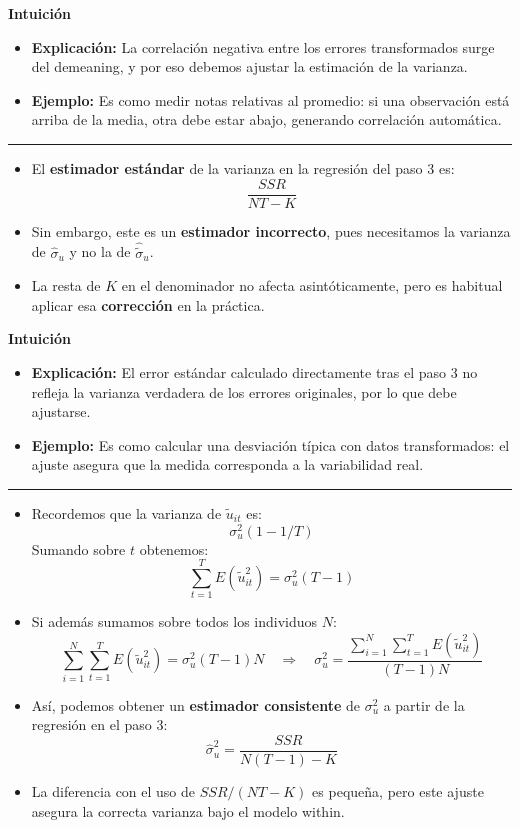 \documentclass[12pt]{article}
\begin{document}
\noindent\textbf{Intuición}
\begin{itemize}
    \item \textbf{Explicación:} La correlación negativa entre los errores transformados surge del demeaning, y por eso debemos ajustar la estimación de la varianza.
    \item \textbf{Ejemplo:} Es como medir notas relativas al promedio: si una observación está arriba de la media, otra debe estar abajo, generando correlación automática.
\end{itemize}

\hrule

\begin{itemize}
    \item El \textbf{estimador estándar} de la varianza en la regresión del paso 3 es:
    \[
    \frac{SSR}{NT - K}
    \]
    
    \item Sin embargo, este es un \textbf{estimador incorrecto}, pues necesitamos la varianza de $\hat{\sigma}_u$ y no la de $\hat{\tilde{\sigma}}_u$.
    
    \item La resta de $K$ en el denominador no afecta asintóticamente,  
    pero es habitual aplicar esa \textbf{corrección} en la práctica.
\end{itemize}

\noindent\textbf{Intuición}
\begin{itemize}
    \item \textbf{Explicación:} El error estándar calculado directamente tras el paso 3 no refleja la varianza verdadera de los errores originales, por lo que debe ajustarse.
    \item \textbf{Ejemplo:} Es como calcular una desviación típica con datos transformados: el ajuste asegura que la medida corresponda a la variabilidad real.
\end{itemize}

\hrule

\begin{itemize}
    \item Recordemos que la varianza de $\tilde{u}_{it}$ es:  
    \[
    \sigma_u^2 (1 - 1/T)
    \]
    Sumando sobre $t$ obtenemos:
    \[
    \sum_{t=1}^T E(\tilde{u}_{it}^2) = \sigma_u^2 (T-1)
    \]

    \item Si además sumamos sobre todos los individuos $N$:
    \[
    \sum_{i=1}^N \sum_{t=1}^T E(\tilde{u}_{it}^2) 
    = \sigma_u^2 (T-1)N
    \quad \Rightarrow \quad
    \sigma_u^2 = 
    \frac{\sum_{i=1}^N \sum_{t=1}^T E(\tilde{u}_{it}^2)}{(T-1)N}
    \]

    \item Así, podemos obtener un \textbf{estimador consistente} de $\sigma_u^2$ a partir de la regresión en el paso 3:  
    \[
    \hat{\sigma}_u^2 = \frac{SSR}{N(T-1) - K}
    \]

    \item La diferencia con el uso de $SSR/(NT-K)$ es pequeña, pero este ajuste asegura la correcta varianza bajo el modelo within.
\end{itemize}
\end{document}
